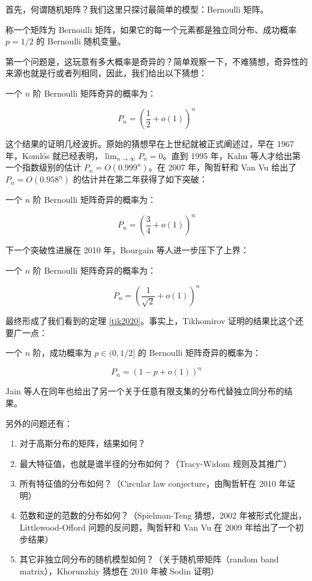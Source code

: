首先，何谓随机矩阵？我们这里只探讨最简单的模型：Bernoulli 矩阵。

\begin{definition}
    称一个矩阵为 Bernoulli 矩阵，如果它的每一个元素都是独立同分布、成功概率 $p = 1/2$ 的 Bernoulli 随机变量。
\end{definition}

第一个问题是，这玩意有多大概率是奇异的？简单观察一下，不难猜想，奇异性的来源也就是行或者列相同，因此，我们给出以下猜想：

\begin{theorem}[Tikhomirov, 2020]\label{tik2020}
    一个 $n$ 阶 Bernoulli 矩阵奇异的概率为：

    $$
    P_n = \left( \frac{1}{2} + o(1) \right)^n
    $$
\end{theorem}

这个结果的证明几经波折。原始的猜想早在上世纪就被正式阐述过，早在 1967 年，Koml\'os 就已经表明，$\lim_{n \to \infty} P_n = 0$。直到 1995 年，Kahn 等人才给出第一个指数级别的估计 $P_n = O(0.999^n)$。在 2007 年，陶哲轩和 Van Vu 给出了 $P_n = O(0.958^n)$ 的估计并在第二年获得了如下突破：

\begin{theorem}[Tao-Vu, 2007]
    一个 $n$ 阶 Bernoulli 矩阵奇异的概率为：

    $$
    P_n = \left( \frac{3}{4} + o(1) \right)^n
    $$
\end{theorem}

下一个突破性进展在 2010 年，Bourgain 等人进一步压下了上界：

\begin{theorem}[Bourgain, 2010]
    一个 $n$ 阶 Bernoulli 矩阵奇异的概率为：

    $$
    P_n = \left( \frac{1}{\sqrt{2}} + o(1) \right)^n
    $$
\end{theorem}

最终形成了我们看到的定理 \ref{tik2020}。事实上，Tikhomirov 证明的结果比这个还要广一点：

\begin{theorem}[Tikhomirov, 2020]
    一个 $n$ 阶，成功概率为 $p \in (0, 1/2]$ 的 Bernoulli 矩阵奇异的概率为：

    $$
    P_n = \left( 1 - p + o(1) \right)^n
    $$
\end{theorem}

Jain 等人在同年也给出了另一个关于任意有限支集的分布代替独立同分布的结果。

另外的问题还有：

\begin{enumerate}
    \item 对于高斯分布的矩阵，结果如何？
    \item 最大特征值，也就是谱半径的分布如何？（Tracy-Widom 规则及其推广）
    \item 所有特征值的分布如何？（Circular law conjecture，由陶哲轩在 2010 年证明）
    \item 范数和逆的范数的分布如何？（Spielman-Teng 猜想，2002 年被形式化提出，Littlewood-Offord 问题的反问题，陶哲轩和 Van Vu 在 2009 年给出了一个初步结果）
    \item 其它非独立同分布的随机模型如何？（关于随机带矩阵（random band matrix），Khorunzhiy 猜想在 2010 年被 Sodin 证明）
\end{enumerate}

